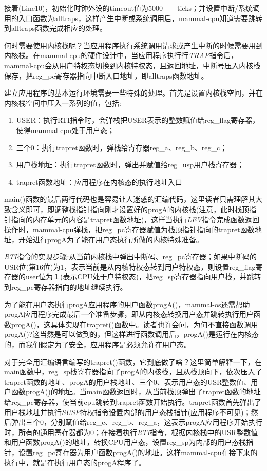 接着(Line10)，初始化时钟外设的timeout值为5000　　ticks；并设置中断/系统调用的入口函数为alltraps，这样产生中断或系统调用后，mammal-cpu知道需要跳转到alltraps函数完成相应的处理。

何时需要使用内核栈呢？当应用程序执行系统调用请求或产生中断的时候需要用到内核栈。在mammal-cpu的硬件设计中，当应用程序执行行\textit{TRAP}指令后，mammal-cpu会从用户特权态切换到内核特权态，且返回地址，中断号压入内核栈保存，把reg\_pc寄存器指向中断入口地址，即alltraps函数地址。

建立应用程序的基本运行环境需要一些特殊的处理。首先是设置内核栈空间，并在内核栈空间中压入一系列的值，包括:
\begin{enumerate}
	\item USER：执行RTI指令时，会弹栈把USER表示的整数赋值给reg\_flag寄存器，使得mammal-cpu处于用户态；
	\item 三个0：执行trapret函数时，弹栈给寄存器reg\_a、reg\_b、reg\_c；
	\item 用户栈地址：执行trapret函数时，弹出并赋值给reg\_usp用户栈寄存器；
	\item trapret函数地址：应用程序在内核态的执行地址入口
\end{enumerate}

main()函数的最后两行代码也是容易让人迷惑的汇编代码，这里读者只需理解其大致含义即可，即调整栈指针指向刚才设置好的progA的内核栈(注意，此时栈顶指针指向的内存单元的内容是trapret函数地址)，这样当执行\textit{LEV}指令完成函数返回操作时，mammal-cpu弹栈，把reg\_pc寄存器赋值为栈顶指针指向的trapret函数地址，开始进行progA为了能在用户态执行所做的内核特殊准备。

\begin{note} 
	\textit{RTI}指令的实现步骤:从当前内核栈中弹出中断码、reg\_pc寄存器；如果中断码的USR位(第16位)为1，表示当前是从内核特权态转到用户特权态，则设置reg\_flag寄存器的user位为１(表示CPU处于户特权态)，把reg\_sp寄存器指向用户栈，并跳转到reg\_pc寄存器指向的地址继续执行。
\end{note} 

为了能在用户态执行progA应用程序的用户函数progA()，mammal-os还需帮助progA应用程序完成最后一个准备步骤，即从内核态转换用户态并跳转执行用户函数progA()，这具体实现在trapret()函数中。读者也许会问，为何不直接函数调用progA()?这当然是可以做到的，但这样进行函数调用后，progA()是运行在内核态的，而我们假定为了安全，应用程序是必须允许在用户态。

对于完全用汇编语言编写的trapret()函数，它到底做了啥？这里简单解释一下，在main函数中，reg\_sp栈寄存器指向了progA的内核栈，且从栈顶向下，依次压入了trapret函数的地址、progA的用户栈地址、三个0、表示用户态的USR整数值、用户函数progA()的地址。当main函数返回时，从当前栈顶弹出了trapret函数的地址给reg\_pc寄存器，使当前cpu跳转到trapret函数开始执行。trapret函数首先弹出了用户栈地址并执行\textit{SUSP}特权指令设置内部的用户态栈指针(应用程序不可见)；然后弹出三个0，分别赋值给reg\_c、reg\_b、reg\_a，这表示progA应用程序开始执行时，所有的通用寄存器都为0；在接着执行\textit{RTI}指令，根据内核栈中的USR整数值和用户函数progA()的地址，转换CPU用户态，设置reg\_sp为内部的用户态栈指针，设置reg\_pc寄存器为用户函数progA()的地址。这样mammal-cpu在接下来的执行中，就是在执行用户态的progA程序了。

